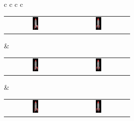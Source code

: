 \begin{figure}[!htb]
\begin{tabular*}{\textwidth}{ c c c c }
        
        \setlength\tabcolsep{0pt}
        \begin{tabular}{cc}
            \includegraphics[width=0.1\textwidth]{figures/results/col_set/rocket0_targ_256px.png} & \includegraphics[width=0.1\textwidth]{figures/results/col_set/rocket4_targ_256px.png}
        \end{tabular}
        &
        \setlength\tabcolsep{0pt}
        \begin{tabular}{cc}
            \includegraphics[width=0.1\textwidth]{figures/results/col_set/rocket0_excol_150k.png} & \includegraphics[width=0.1\textwidth]{figures/results/col_set/rocket4_excol_150k.png}
        \end{tabular}
        &
        \setlength\tabcolsep{0pt}
        \begin{tabular}{cc}
            \includegraphics[width=0.1\textwidth]{figures/results/col_set/rocket0_exva_150k.png} & \includegraphics[width=0.1\textwidth]{figures/results/col_set/rocket4_exva_150k.png}

\end{tabular}
\end{tabular*}
\end{figure}
